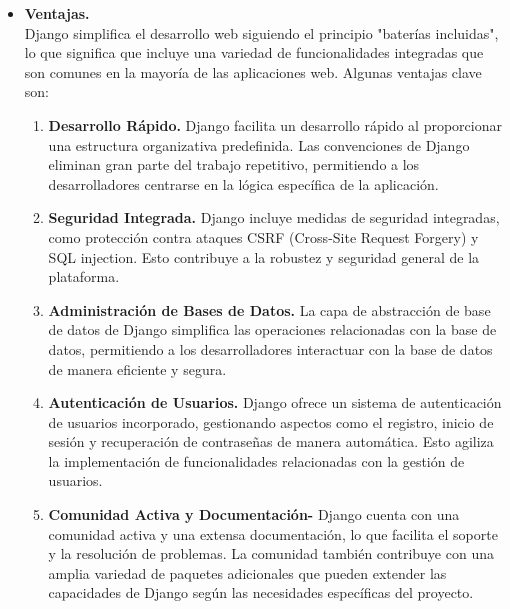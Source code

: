 \documentclass{article}
\begin{document}
\begin{itemize}
                \item \textbf{Ventajas.}\\
                Django simplifica el desarrollo web siguiendo el principio "baterías incluidas", lo que significa que incluye una variedad de funcionalidades integradas que son comunes en la mayoría de las aplicaciones web. Algunas ventajas clave son:

                \begin{enumerate}
                    \item \textbf{Desarrollo Rápido.}
                    Django facilita un desarrollo rápido al proporcionar una estructura organizativa predefinida. Las convenciones de Django eliminan gran parte del trabajo repetitivo, permitiendo a los desarrolladores centrarse en la lógica específica de la aplicación.

                    \item \textbf{Seguridad Integrada.}
                    Django incluye medidas de seguridad integradas, como protección contra ataques CSRF (Cross-Site Request Forgery) y SQL injection. Esto contribuye a la robustez y seguridad general de la plataforma.

                    \item \textbf{Administración de Bases de Datos.}
                    La capa de abstracción de base de datos de Django simplifica las operaciones relacionadas con la base de datos, permitiendo a los desarrolladores interactuar con la base de datos de manera eficiente y segura.

                    \item \textbf{Autenticación de Usuarios.}
                    Django ofrece un sistema de autenticación de usuarios incorporado, gestionando aspectos como el registro, inicio de sesión y recuperación de contraseñas de manera automática. Esto agiliza la implementación de funcionalidades relacionadas con la gestión de usuarios.

                    \item \textbf{Comunidad Activa y Documentación-}
                    Django cuenta con una comunidad activa y una extensa documentación, lo que facilita el soporte y la resolución de problemas. La comunidad también contribuye con una amplia variedad de paquetes adicionales que pueden extender las capacidades de Django según las necesidades específicas del proyecto.
                \end{enumerate}
            \end{itemize}
\end{document}
